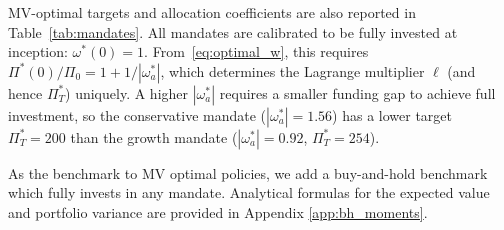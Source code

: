 \documentclass[11pt,a4paper]{article}
\numberwithin{equation}{section}
\begin{document}
MV-optimal targets and allocation 
coefficients are also reported in Table~\ref{tab:mandates}. All mandates are calibrated to be fully invested at inception: 
$\omega^*(0) = 1$. From~\eqref{eq:optimal_w}, this requires 
$\Pi^*(0)/\Pi_0 = 1 + 1/|\omega^*_a|$, which determines the 
Lagrange multiplier $\ell$ (and hence $\Pi^*_T$) uniquely. 
A higher $|\omega^*_a|$ requires a smaller funding gap to achieve 
full investment, so the conservative mandate ($|\omega^*_a| = 1.56$) 
has a lower target $\Pi^*_T = 200$ than the growth mandate 
($|\omega^*_a| = 0.92$, $\Pi^*_T = 254$).

As the benchmark to MV optimal policies, we add a buy-and-hold benchmark which fully invests in any mandate. Analytical formulas for the expected value and portfolio variance are provided in Appendix \ref{app:bh_moments}.
\end{document}
